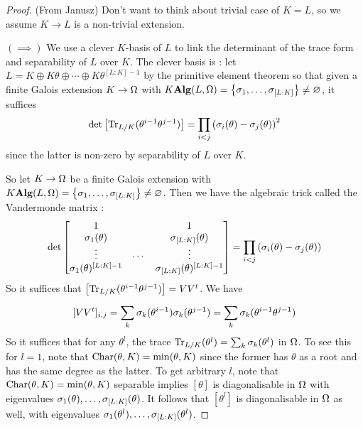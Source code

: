 \documentclass[./main.tex]{subfiles}
\begin{document}
\begin{proof}(From Janusz) Don't want to think about trivial case of $K = L$,
  so we assume $K \to L$ is a non-trivial extension.

  $(\implies)$
  We use a clever $K$-basis of $L$ to link 
  the determinant of the trace form and separability of $L$ over $K$.
  The clever basis is : 
  let $L = K \oplus K\theta \oplus \cdots \oplus K\theta^{[L:K]-1}$
  by the primitive element theorem so that 
  given a finite Galois extension $K \to \Omega$ 
  with $K\mathbf{Alg}(L,\Omega) = \left\{\sigma_1,\dots,\sigma_{[L:K]}\right\} \neq \varnothing$,
  it suffices 
  \[
    \det \left[\operatorname{Tr}_{L/K}(\theta^{i-1}\theta^{j-1})\right]
    = \prod_{i < j} \left(\sigma_i(\theta) - \sigma_j(\theta)\right)^2
  \]
  since the latter is non-zero by separability of $L$ over $K$.

  So let $K \to \Omega$ be a finite Galois extension
  with $K\mathbf{Alg}(L,\Omega) = \left\{\sigma_1,\dots,\sigma_{[L:K]}\right\} \neq \varnothing$.
  Then we have the algebraic trick called the Vandermonde matrix : 
  \[
    \det \begin{bmatrix}
      1 & &                         1                       \\
      \sigma_1(\theta) & &             \sigma_{[L:K]}(\theta)           \\
      \vdots & \cdots &             \vdots       \\
      \sigma_1(\theta)^{[L:K] - 1} & & \sigma_{[L:K]}(\theta)^{[L:K] - 1}
    \end{bmatrix}
    = \prod_{i < j} \left(\sigma_i(\theta) - \sigma_j(\theta)\right)
  \]
  So it suffices that $\left[\operatorname{Tr}_{L/K}(\theta^{i-1}\theta^{j-1})\right] = VV^t$.
  We have \[
    [VV^t]_{i,j} = \sum_{k}^{} \sigma_k(\theta^{i - 1})\sigma_k(\theta^{j-1})
    = \sum_{k}^{} \sigma_k(\theta^{i - 1}\theta^{j-1})
  \]
  So it suffices that for any $\theta^l$, 
  the trace $\operatorname{Tr}_{L/K}(\theta^l) = \sum_{k}^{} \sigma_k(\theta^l)$ in $\Omega$.
  To see this for $l = 1$, 
  note that $\operatorname{Char}(\theta,K) = \min(\theta,K)$ since 
  the former has $\theta$ as a root and has the same degree as the latter.
  To get arbitrary $l$, 
  note that $\operatorname{Char}(\theta,K) = \min(\theta,K)$ separable implies 
  $[\theta]$ is diagonalisable in $\Omega$ with eigenvalues 
  $\sigma_1(\theta),\dots,\sigma_{[L:K]}(\theta)$.
  It follows that $[\theta^l]$ is diagonalisable in $\Omega$ as well,
  with eigenvalues $\sigma_1(\theta^l),\dots,\sigma_{[L:K]}(\theta^l)$.


\end{proof}
\end{document}
